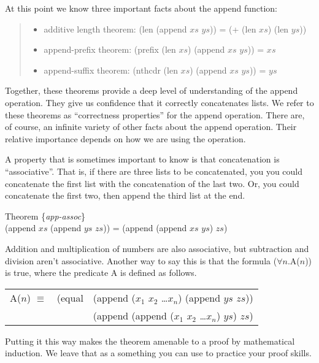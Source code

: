At this point we know three important facts about the append function:
\begin{quote}
\begin{itemize}
\item additive length theorem: (len (append $xs$ $ys$)) = (+ (len $xs$) (len $ys$))
\item append-prefix theorem: (prefix (len $xs$) (append $xs$ $ys$)) = $xs$
\item append-suffix theorem: (nthcdr (len $xs$) (append $xs$ $ys$)) = $ys$
\end{itemize}
\end{quote}

Together, these theorems provide a deep level of understanding of the append operation. 
They give us confidence that it correctly concatenates lists. 
We refer to these theorems as ``correctness properties'' for the append operation. 
There are, of course, an infinite variety of other facts about the append operation. 
Their relative importance depends on how we are using the operation.

A property that is sometimes important to know is that concatenation is ``associative''. 
That is, if there are three lists to be concatenated, 
you you could concatenate the first list with the concatenation of the last two. 
Or, you could concatenate the first two, then append the third list at the end.

\begin{center}
Theorem \{\emph{app-assoc}\} \\
\label{app-assoc}
(append $xs$ (append $ys$ $zs$)) = (append (append $xs$ $ys$) $zs$)
\end{center}

Addition and multiplication of numbers are also associative,
but subtraction and division aren't associative. 
Another way to say this is that the formula 
($\forall$$n$.A($n$)) is true, where the predicate A is defined as follows.

\begin{center}
\begin{tabular} {lll}
A($n$) $\equiv$  & (equal & (append ($x_1$ $x_2$ \dots $x_n$) (append $ys$ $zs$)) \\
                 &        & (append (append ($x_1$ $x_2$ \dots $x_n$) $ys$) $zs$) \\
\end{tabular}
\end{center}

Putting it this way makes the theorem amenable to a proof by mathematical induction. We leave that as a something you can use to practice your proof skills.

